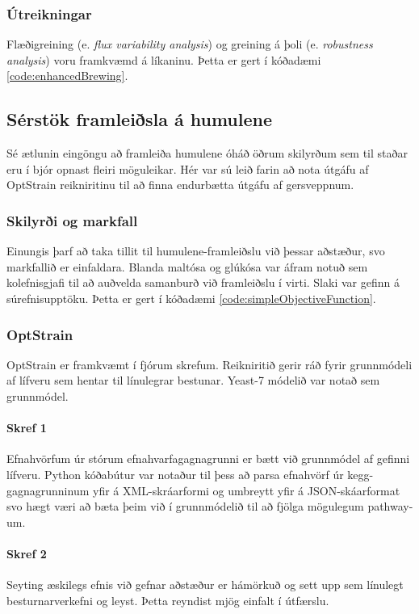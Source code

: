 \documentclass[11pt]{article}
\begin{document}
\begin{multicols}{2}
\subsubsection{Útreikningar}
Flæðigreining (e. \emph{flux variability analysis}) og greining á þoli (e. \emph{robustness analysis}) voru framkvæmd á líkaninu. Þetta er gert í kóðadæmi \ref{code:enhancedBrewing}.

\subsection{Sérstök framleiðsla á humulene}
Sé ætlunin eingöngu að framleiða humulene óháð öðrum skilyrðum sem til staðar eru í bjór opnast fleiri möguleikar. Hér var sú leið farin að nota útgáfu af OptStrain reikniritinu \cite{pharkya2004optstrain} til að finna endurbætta útgáfu af gersveppnum.
\subsubsection{Skilyrði og markfall}
Einungis þarf að taka tillit til humulene-framleiðslu við þessar aðstæður, svo markfallið er einfaldara. Blanda maltósa og glúkósa var áfram notuð sem kolefnisgjafi til að auðvelda samanburð við framleiðslu í virti. Slaki var gefinn á súrefnisupptöku. Þetta er gert í kóðadæmi \ref{code:simpleObjectiveFunction}.
\subsubsection{OptStrain}
\label{sec:optstrain}
OptStrain er framkvæmt í fjórum skrefum. Reikniritið gerir ráð fyrir grunnmódeli af lífveru sem hentar til línulegrar bestunar. Yeast-7 módelið var notað sem grunnmódel.

\paragraph{Skref 1}
Efnahvörfum úr stórum efnahvarfagagnagrunni er bætt við grunnmódel af gefinni lífveru. Python kóðabútur var notaður til þess að parsa efnahvörf úr kegg-gagnagrunninum yfir á XML-skráarformi og umbreytt yfir á JSON-skáarformat svo hægt væri að bæta þeim við í grunnmódelið til að fjölga mögulegum pathway-um.

\paragraph{Skref 2}
Seyting æskilegs efnis við gefnar aðstæður er hámörkuð og sett upp sem línulegt besturnarverkefni og leyst. Þetta reyndist mjög einfalt í útfærslu.


\end{multicols}
\end{document}
